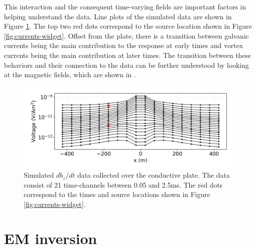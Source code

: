 \documentclass[paper]{geophysics}
\begin{document}

This interaction and the consequent time-varying fields are important factors in helping understand the data. Line plots of the simulated data are shown in Figure \ref{fig:aem-data}. The top two red dots correspond to the source location shown in Figure \ref{fig:currents-widget}. Offset from the plate, there is a transition between galvanic currents being the main contribution to the response at early times and vortex currents being the main contribution at later times. The transition between these behaviors and their connection to the data can be further understood by looking at the magnetic fields, which are shown in \cite{Heagy2018}.


\begin{figure}
    \begin{center}
    \includegraphics[width=\columnwidth]{figures/aem-data.png}
    \end{center}
\caption{
    Simulated $db_z/dt$ data collected over the conductive plate. The data consist of 21 time-channels between 0.05 and 2.5ms. The red dots correspond to the times and source locations shown in Figure \ref{fig:currents-widget}.
}
\label{fig:aem-data}
\end{figure}




\section{EM inversion}
\end{document}
